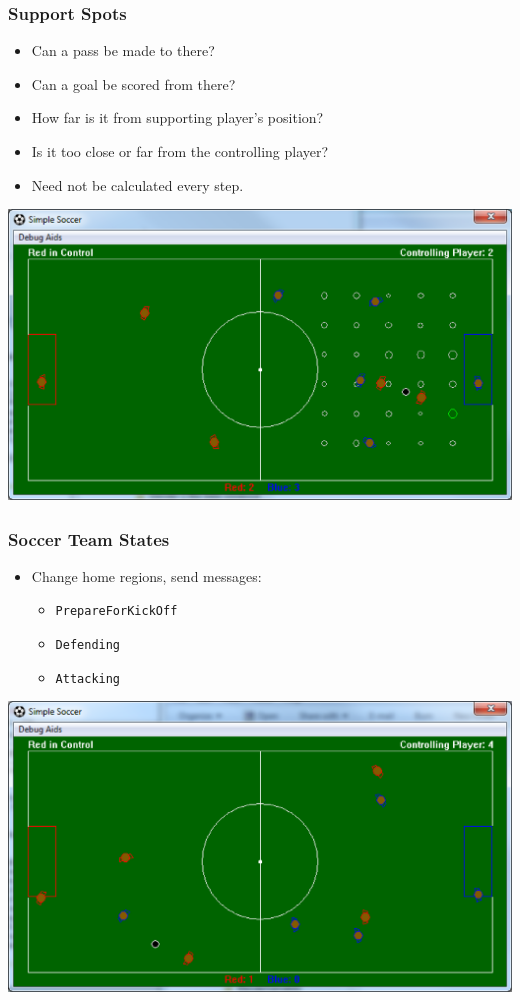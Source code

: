 \documentclass[handout,t,compress]{beamer}
\newcommand{\bframe}[1]{\begin{frame}[fragile]\frametitle{{#1}}}
\newcommand{\bi}{\begin{itemize}}
\newcommand{\li}{\item}
\newcommand{\ei}{\end{itemize}}
\begin{document}
\bframe{Support Spots}
\scriptsize
\begin{itemize}
\item Can a pass be made to there?
\item Can a goal be scored from there?
\item How far is it from supporting player's position?
\item Is it too close or far from  the controlling player?
\item Need not be calculated every step.
\end{itemize}
\includegraphics[scale=0.4]{simplesoccersupportspots.eps}
\end{frame}

\bframe{Soccer Team States}
\bi
\li  Change home regions, send messages:
\begin{itemize}
\item {\tt PrepareForKickOff}
\item {\tt Defending}
\item {\tt Attacking}
\end{itemize}
\ei
\includegraphics[scale=0.4]{simplesoccergame.eps}
\end{frame}
\end{document}
